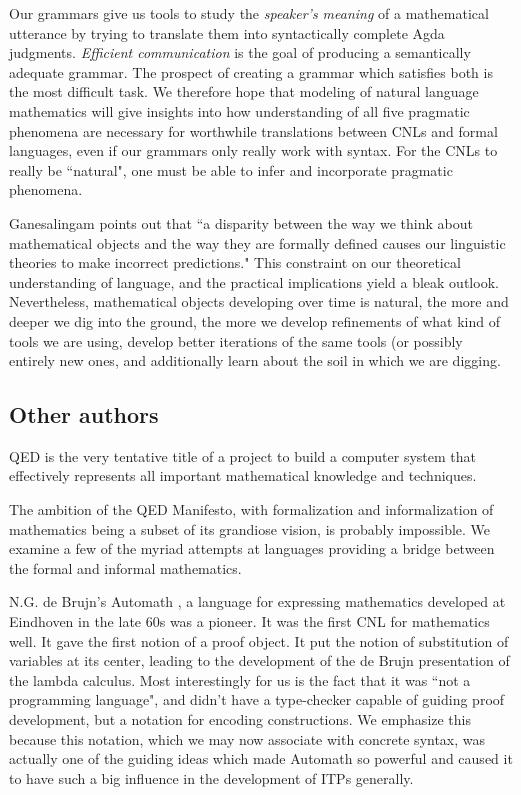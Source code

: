 Our grammars give us tools to study the \emph{speaker's meaning} of a
mathematical utterance by trying to translate them into syntactically complete
Agda judgments. \emph{Efficient communication} is the goal of producing a
semantically adequate grammar. The prospect of creating a grammar which
satisfies both is the most difficult task. We therefore hope that modeling of
natural language mathematics will give insights into how understanding of all
five pragmatic phenomena are necessary for worthwhile translations between CNLs
and formal languages, even if our grammars only really work with syntax. For the
CNLs to really be ``natural", one must be able to infer and incorporate
pragmatic phenomena.

Ganesalingam points out that ``a disparity between the way we think about
mathematical objects and the way they are formally defined causes our linguistic
theories to make incorrect predictions." This constraint on our theoretical
understanding of language, and the practical implications yield a bleak outlook.
Nevertheless, mathematical objects developing over time is natural, the more and
deeper we dig into the ground, the more we develop refinements of what kind of
tools we are using, develop better iterations of the same tools (or possibly
entirely new ones, and additionally learn about the soil in which we are
digging.

\subsection{Other authors}

\begin{displayquote}
QED is the very tentative title of a project to build a computer system that effectively represents all important mathematical knowledge and techniques.
\cite{godel1994qed} 
\end{displayquote}

The ambition of the QED Manifesto, with formalization and informalization of
mathematics being a subset of its grandiose vision, is probably impossible. We
examine a few of the myriad attempts at languages providing a bridge between the
formal and informal mathematics.

N.G. de Brujn's Automath \cite{debrujn}, a language for expressing mathematics
developed at Eindhoven in the late 60s was a pioneer. It was the first CNL for
mathematics well. It gave the first notion of a proof object. It put the notion
of substitution of variables at its center, leading to the development of the de
Brujn presentation of the lambda calculus. Most interestingly for us is the fact
that it was ``not a programming language", and didn't have a type-checker
capable of guiding proof development, but a notation for encoding constructions.
We emphasize this because this notation, which we may now associate with
concrete syntax, was actually one of the guiding ideas which made Automath so
powerful and caused it to have such a big influence in the development of ITPs
generally.

